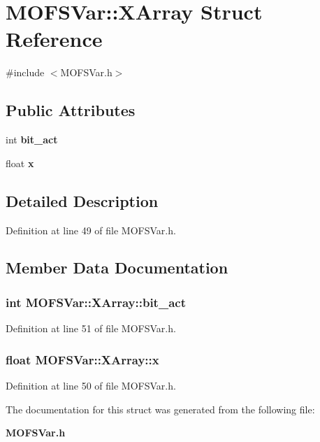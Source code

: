 \section{M\-O\-F\-S\-Var\-:\-:X\-Array Struct Reference}
\label{structMOFSVar_1_1XArray}


{\ttfamily \#include $<$M\-O\-F\-S\-Var.\-h$>$}

\subsection*{Public Attributes}
\begin{DoxyCompactItemize}
\item 
int {\bf bit\-\_\-act}
\item 
float {\bf x}
\end{DoxyCompactItemize}


\subsection{Detailed Description}


Definition at line 49 of file M\-O\-F\-S\-Var.\-h.



\subsection{Member Data Documentation}
\subsubsection[{bit\-\_\-act}]{\setlength{\rightskip}{0pt plus 5cm}int M\-O\-F\-S\-Var\-::\-X\-Array\-::bit\-\_\-act}\label{structMOFSVar_1_1XArray_aafc6fc7a075692c0a04c83562c96e80f}


Definition at line 51 of file M\-O\-F\-S\-Var.\-h.

\subsubsection[{x}]{\setlength{\rightskip}{0pt plus 5cm}float M\-O\-F\-S\-Var\-::\-X\-Array\-::x}\label{structMOFSVar_1_1XArray_a496f909b0e72f64f360c4e4b4e863267}


Definition at line 50 of file M\-O\-F\-S\-Var.\-h.



The documentation for this struct was generated from the following file\-:\begin{DoxyCompactItemize}
\item 
{\bf M\-O\-F\-S\-Var.\-h}\end{DoxyCompactItemize}

